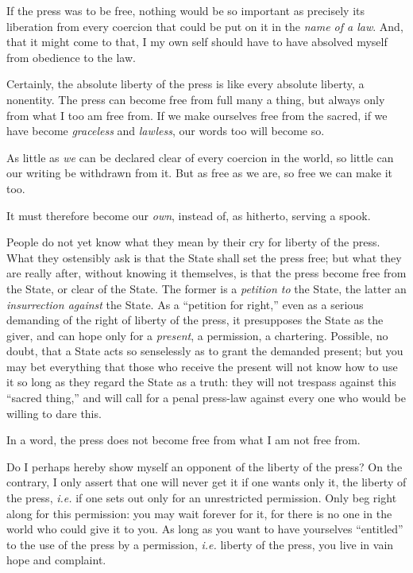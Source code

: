 \documentclass[12pt,a4paper]{book}
\begin{document}
If the press was to be free, nothing would be so important as precisely its 
liberation from every coercion that could be put on it in the \textit{name of 
a law}. And, that it might come to that, I my own self should have to have 
absolved myself from obedience to the law.

Certainly, the absolute liberty of the press is like every absolute liberty, a 
nonentity. The press can become free from full many a thing, but always only 
from what I too am free from. If we make ourselves free from the sacred, if we 
have become \textit{graceless} and \textit{lawless}, our words too will become 
so.

As little as \textit{we} can be declared clear of every coercion in the world, 
so little can our writing be withdrawn from it. But as free as we are, so free 
we can make it too.

It must therefore become our \textit{own}, instead of, as hitherto, serving a 
spook.

People do not yet know what they mean by their cry for liberty of the press. 
What they ostensibly ask is that the State shall set the press free; but what 
they are really after, without knowing it themselves, is that the press become 
free from the State, or clear of the State. The former is a \textit{petition 
to} the State, the latter an \textit{insurrection against} the State. As a 
``petition for right,'' even as a serious demanding of the right of liberty 
of the press, it presupposes the State as the giver, and can hope only for a 
\textit{present}, a permission, a chartering. Possible, no doubt, that a State 
acts so senselessly as to grant the demanded present; but you may bet 
everything that those who receive the present will not know how to use it so 
long as they regard the State as a truth: they will not trespass against this 
``sacred thing,'' and will call for a penal press-law against every one who 
would be willing to dare this.

In a word, the press does not become free from what I am not free from.

Do I perhaps hereby show myself an opponent of the liberty of the press? On 
the contrary, I only assert that one will never get it if one wants only it, 
the liberty of the press, \textit{i.e.} if one sets out only for an 
unrestricted permission. Only beg right along for this permission: you may 
wait forever for it, for there is no one in the world who could give it to 
you. As long as you want to have yourselves ``entitled'' to the use of the 
press by a permission, \textit{i.e.} liberty of the press, you live in vain 
hope and complaint.
\end{document}
